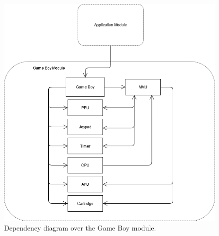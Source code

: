 \newpage
\begin{figure}[H]
    \centering
    \includegraphics[scale=0.45]{figures/Game Boy Dependencies.png}
    \caption{Dependency diagram over the Game Boy module.}
    \label{fig:dependency_diagram}
\end{figure}







